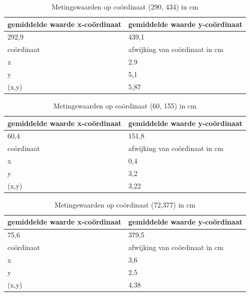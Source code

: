 \documentclass{article}
\begin{document}
\begin{table}[h!]
\centering
\caption{Metingswaarden op co\"ordinaat (290, 434) in cm}\label{table:res1}
\begin{tabular}{ |l|l| }
  \hline
    gemiddelde waarde x-co\"ordinaat & gemiddelde waarde y-co\"ordinaat \\ \hline
     292,9 & 439,1 \\ \hline  \hline
  co\"ordinaat & afwijking van co\"ordinaat in cm\\ \hline 
  x & 2,9 \\ \hline
  y & 5,1 \\ \hline
  (x,y) & 5,87 \\ \hline
\end{tabular}
\end{table}

\begin{table}[h!]
\centering
\caption{Metingswaarden op co\"ordinaat (60, 155) in cm}\label{table:res2}
\begin{tabular}{ |l|l| }
  \hline
    gemiddelde waarde x-co\"ordinaat & gemiddelde waarde y-co\"ordinaat \\ \hline
     60,4 & 151,8 \\ \hline  \hline
  co\"ordinaat & afwijking van co\"ordinaat in cm\\ \hline 
  x & 0,4 \\ \hline
  y & 3,2 \\ \hline
  (x,y) & 3,22 \\ \hline
\end{tabular}
\end{table}

\begin{table}[h!]
\centering
\caption{Metingswaarden op co\"ordinaat (72,377) in cm}\label{table:res3}
\begin{tabular}{ |l|l| }
  \hline
    gemiddelde waarde x-co\"ordinaat & gemiddelde waarde y-co\"ordinaat \\ \hline
     75,6 & 379,5 \\ \hline  \hline
  co\"ordinaat & afwijking van co\"ordinaat in cm\\ \hline 
  x & 3,6 \\ \hline
  y & 2,5 \\ \hline
  (x,y) & 4,38 \\ \hline
\end{tabular}
\end{table}
\newpage
\end{document}
